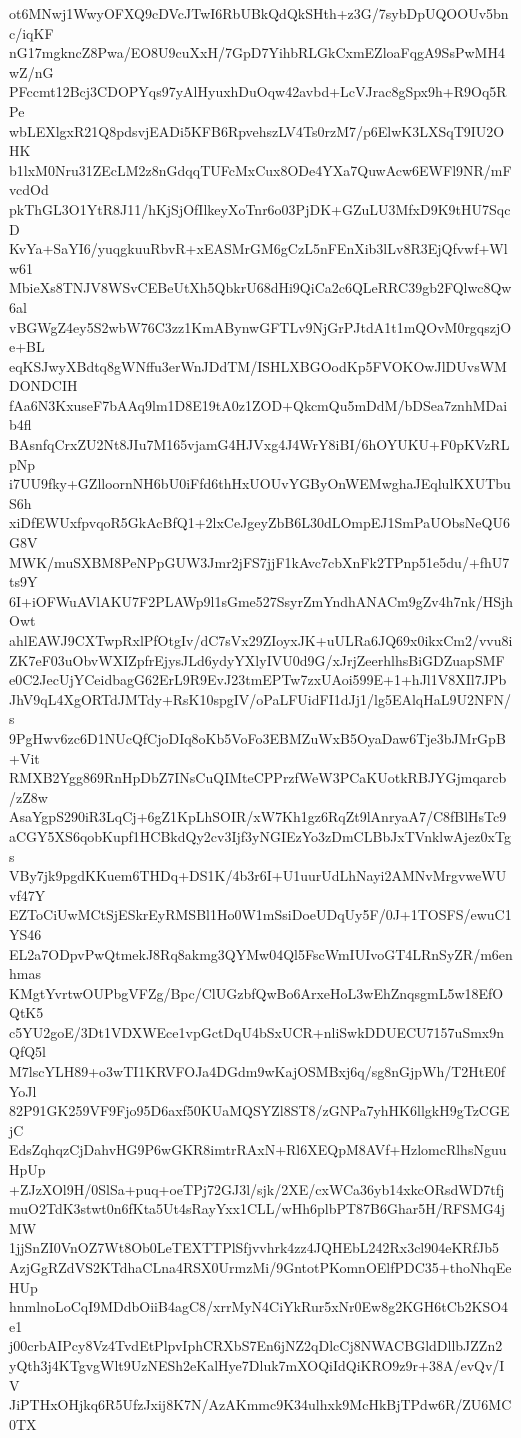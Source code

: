 ot6MNwj1WwyOFXQ9cDVcJTwI6RbUBkQdQkSHth+z3G/7sybDpUQOOUv5bnc/iqKF
nG17mgkncZ8Pwa/EO8U9cuXxH/7GpD7YihbRLGkCxmEZloaFqgA9SsPwMH4wZ/nG
PFccmt12Bcj3CDOPYqs97yAlHyuxhDuOqw42avbd+LcVJrac8gSpx9h+R9Oq5RPe
wbLEXlgxR21Q8pdsvjEADi5KFB6RpvehszLV4Ts0rzM7/p6ElwK3LXSqT9IU2OHK
b1lxM0Nru31ZEcLM2z8nGdqqTUFcMxCux8ODe4YXa7QuwAcw6EWFl9NR/mFvcdOd
pkThGL3O1YtR8J11/hKjSjOfIlkeyXoTnr6o03PjDK+GZuLU3MfxD9K9tHU7SqcD
KvYa+SaYI6/yuqgkuuRbvR+xEASMrGM6gCzL5nFEnXib3lLv8R3EjQfvwf+Wlw61
MbieXs8TNJV8WSvCEBeUtXh5QbkrU68dHi9QiCa2c6QLeRRC39gb2FQlwc8Qw6al
vBGWgZ4ey5S2wbW76C3zz1KmABynwGFTLv9NjGrPJtdA1t1mQOvM0rgqszjOe+BL
eqKSJwyXBdtq8gWNffu3erWnJDdTM/ISHLXBGOodKp5FVOKOwJlDUvsWMDONDCIH
fAa6N3KxuseF7bAAq9lm1D8E19tA0z1ZOD+QkcmQu5mDdM/bDSea7znhMDaib4fl
BAsnfqCrxZU2Nt8JIu7M165vjamG4HJVxg4J4WrY8iBI/6hOYUKU+F0pKVzRLpNp
i7UU9fky+GZlloornNH6bU0iFfd6thHxUOUvYGByOnWEMwghaJEqlulKXUTbuS6h
xiDfEWUxfpvqoR5GkAcBfQ1+2lxCeJgeyZbB6L30dLOmpEJ1SmPaUObsNeQU6G8V
MWK/muSXBM8PeNPpGUW3Jmr2jFS7jjF1kAvc7cbXnFk2TPnp51e5du/+fhU7ts9Y
6I+iOFWuAVlAKU7F2PLAWp9l1sGme527SsyrZmYndhANACm9gZv4h7nk/HSjhOwt
ahlEAWJ9CXTwpRxlPfOtgIv/dC7sVx29ZIoyxJK+uULRa6JQ69x0ikxCm2/vvu8i
ZK7eF03uObvWXIZpfrEjysJLd6ydyYXlyIVU0d9G/xJrjZeerhlhsBiGDZuapSMF
e0C2JecUjYCeidbagG62ErL9R9EvJ23tmEPTw7zxUAoi599E+1+hJl1V8XIl7JPb
JhV9qL4XgORTdJMTdy+RsK10spgIV/oPaLFUidFI1dJj1/lg5EAlqHaL9U2NFN/s
9PgHwv6zc6D1NUcQfCjoDIq8oKb5VoFo3EBMZuWxB5OyaDaw6Tje3bJMrGpB+Vit
RMXB2Ygg869RnHpDbZ7INsCuQIMteCPPrzfWeW3PCaKUotkRBJYGjmqarcb/zZ8w
AsaYgpS290iR3LqCj+6gZ1KpLhSOIR/xW7Kh1gz6RqZt9lAnryaA7/C8fBlHsTc9
aCGY5XS6qobKupf1HCBkdQy2cv3Ijf3yNGIEzYo3zDmCLBbJxTVnklwAjez0xTgs
VBy7jk9pgdKKuem6THDq+DS1K/4b3r6I+U1uurUdLhNayi2AMNvMrgvweWUvf47Y
EZToCiUwMCtSjESkrEyRMSBl1Ho0W1mSsiDoeUDqUy5F/0J+1TOSFS/ewuC1YS46
EL2a7ODpvPwQtmekJ8Rq8akmg3QYMw04Ql5FscWmIUIvoGT4LRnSyZR/m6enhmas
KMgtYvrtwOUPbgVFZg/Bpc/ClUGzbfQwBo6ArxeHoL3wEhZnqsgmL5w18EfOQtK5
c5YU2goE/3Dt1VDXWEce1vpGctDqU4bSxUCR+nliSwkDDUECU7157uSmx9nQfQ5l
M7lscYLH89+o3wTI1KRVFOJa4DGdm9wKajOSMBxj6q/sg8nGjpWh/T2HtE0fYoJl
82P91GK259VF9Fjo95D6axf50KUaMQSYZl8ST8/zGNPa7yhHK6llgkH9gTzCGEjC
EdsZqhqzCjDahvHG9P6wGKR8imtrRAxN+Rl6XEQpM8AVf+HzlomcRlhsNguuHpUp
+ZJzXOl9H/0SlSa+puq+oeTPj72GJ3l/sjk/2XE/cxWCa36yb14xkcORsdWD7tfj
muO2TdK3stwt0n6fKta5Ut4sRayYxx1CLL/wHh6plbPT87B6Ghar5H/RFSMG4jMW
1jjSnZI0VnOZ7Wt8Ob0LeTEXTTPlSfjvvhrk4zz4JQHEbL242Rx3cl904eKRfJb5
AzjGgRZdVS2KTdhaCLna4RSX0UrmzMi/9GntotPKomnOElfPDC35+thoNhqEeHUp
hnmlnoLoCqI9MDdbOiiB4agC8/xrrMyN4CiYkRur5xNr0Ew8g2KGH6tCb2KSO4e1
j00crbAIPcy8Vz4TvdEtPlpvIphCRXbS7En6jNZ2qDlcCj8NWACBGldDllbJZZn2
yQth3j4KTgvgWlt9UzNESh2eKalHye7Dluk7mXOQiIdQiKRO9z9r+38A/evQv/IV
JiPTHxOHjkq6R5UfzJxij8K7N/AzAKmmc9K34ulhxk9McHkBjTPdw6R/ZU6MC0TX
